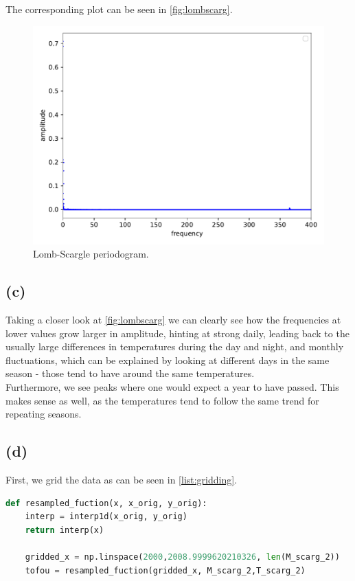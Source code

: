 The corresponding plot can be seen in \autoref{fig:lombscarg}.

\begin{figure}[H]
    \centering
    \includegraphics{plots/lomb_scarg.pdf}
    \caption{Lomb-Scargle periodogram.}
    \label{fig:lombscarg}
\end{figure}

\subsection*{(c)}

Taking a closer look at \autoref{fig:lombscarg} we can clearly see how the frequencies at lower values grow larger in amplitude, hinting at strong
daily, leading back to the usually large differences in temperatures during the day and night, and monthly fluctuations, which  can be explained by looking at different days in the same season 
- those tend to have around the same temperatures. \\

Furthermore, we see peaks where one would expect a year to have passed. This makes sense as well, as the temperatures tend to follow
the same trend for repeating seasons. \\

\subsection*{(d)}

First, we grid the data as can be seen in \autoref{list:gridding}.

\begin{lstlisting}[language = Python, caption={Data gridding.}, label = {list:gridding}]
    def resampled_fuction(x, x_orig, y_orig):
    interp = interp1d(x_orig, y_orig)
    return interp(x)

    gridded_x = np.linspace(2000,2008.9999620210326, len(M_scarg_2))
    tofou = resampled_fuction(gridded_x, M_scarg_2,T_scarg_2)
\end{lstlisting}

